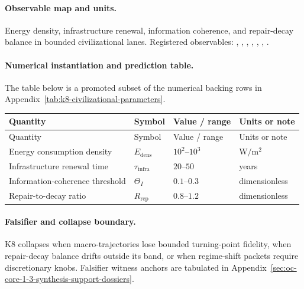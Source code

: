\paragraph{Observable map and units.}
Energy density, infrastructure renewal, information coherence, and repair-decay balance in bounded civilizational lanes.
Registered observables: , \allowbreak {}, \allowbreak {}, \allowbreak {}, \allowbreak {}, \allowbreak {}, \allowbreak {}.

\paragraph{Numerical instantiation and prediction table.}
The table below is a promoted subset of the numerical backing rows in Appendix~\ref{tab:k8-civilizational-parameters}.
\begin{longtable}{@{}L{0.27\textwidth}L{0.15\textwidth}L{0.24\textwidth}L{0.16\textwidth}@{}}
\toprule
Quantity & Symbol & Value / range & Units or note \\
\midrule
\endfirsthead
\toprule
Quantity & Symbol & Value / range & Units or note \\
\midrule
\endhead
Energy consumption density & $\scriptstyle E_{\mathrm{dens}}$ & $10^2\text{--}10^3$ & $\mathrm{W/m^2}$ \\
Infrastructure renewal time & $\scriptstyle \tau_{\mathrm{infra}}$ & $20\text{--}50$ & years \\
Information-coherence threshold & $\scriptstyle \Theta_I$ & $0.1\text{--}0.3$ & dimensionless \\
Repair-to-decay ratio & $\scriptstyle R_{\mathrm{rep}}$ & $0.8\text{--}1.2$ & dimensionless \\
\bottomrule
\end{longtable}

\paragraph{Falsifier and collapse boundary.}
K8 collapses when macro-trajectories lose bounded turning-point fidelity, when repair-decay balance drifts outside its band, or when regime-shift packets require discretionary knobs.
Falsifier witness anchors are tabulated in Appendix~\ref{sec:oc-core-1-3-synthesis-support-dossiers}.

